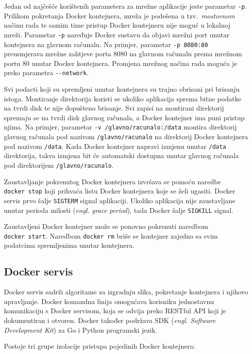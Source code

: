 Jedan od najčešće korištenih parametera za mrežne aplikacije jeste parametar \texttt{-p}. Prilikom
pokretanja Docker kontejnera, mreža je podešena u tzv.~\textit{mostovnom} načinu rada te samim time
pristup Docker kontejneru nije moguć u lokalnoj mreži. Parametar \texttt{-p} naređuje Docker sustavu
da objavi mrežni port unutar kontejnera na glavnom računalu. Na primjer, parametar \texttt{-p
8080:80} preusmjerava mrežne zahtjeve porta 8080 na glavnom računalu prema mrežnom portu 80 unutar
Docker kontejnera. Promjena mrežnog načina rada moguća je preko parametra \texttt{-{}-network}.

Svi podacti koji su spremljeni unutar kontejnera su trajno obrisani pri brisanju istoga. Montiranje
direktorija koristi se ukoliko aplikacija sprema bitne podatke na tvrdi disk te nije dopušteno
brisanje. Svi zapisi na montirani direktorij spremaju se na tvrdi disk glavnog računala, a Docker
kontejner ima puni pristup njima. Na primjer, parametar \texttt{-v /glavno/racunalo:/data} montira
direktorij glavnog računala pod nazivom \texttt{/glavno/racunalo} na direktorij Docker kontejnera
pod nazivom \texttt{/data}. Kada Docker kontejner napravi izmjenu unutar \texttt{/data} direktorija,
takva izmjena bit će automatski dostupna unutar glavnog računala pod direktorijem
\texttt{/glavno/racunalo}.

Zaustavljanje pokrenutog Docker kontejnera izvršava se pomoću naredbe \texttt{docker~stop} koji
prihvaća listu Docker kontejnera koje se želi ugasiti. Docker servis prvo šalje \texttt{SIGTERM}
signal aplikaciji. Ukoliko aplikacija nije zaustavljane unutar perioda milosti (\textit{engl. grace
period}), tada Docker šalje \texttt{SIGKILL} signal.

Zaustavljeni Docker kontejner može se ponovno pokrenuti naredbom \texttt{docker~start}. Naredbom
\texttt{docker~rm} briše se kontejner zajedno sa svim podatcima spremljenima unutar kontejnera.

\subsection{Docker servis}
Docker servis sadrži algoritame za izgradnju slika, pokretanje kontejnera i njihovo upravljanje.
Docker komandna linija omogućava korisniku jednostavnu komunikaciju s Docker servisom, koja se
odvija preko RESTful API koji je dokumentiran i otvoren. Docker također podržava SDK (\textit{engl.
Software Development Kit}) za Go i Python programski jezik.

Postoje tri grupe izolacije pristupa pojedinih Docker kontejnera:

